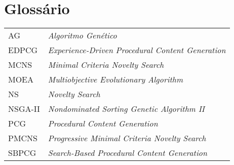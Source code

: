 \chapter*{Glossário}

\begin{tabular}{l p{}}
  AG & \emph{Algoritmo Genético} \\
  EDPCG & \emph{Experience-Driven Procedural Content Generation} \\
  MCNS & \emph{Minimal Criteria Novelty Search} \\
  MOEA & \emph{Multiobjective Evolutionary Algorithm} \\
  NS & \emph{Novelty Search} \\
  NSGA-II & \emph{Nondominated Sorting Genetic Algorithm II} \\
  PCG & \emph{Procedural Content Generation} \\
  PMCNS & \emph{Progressive Minimal Criteria Novelty Search} \\
  SBPCG & \emph{Search-Based Procedural Content Generation} \\
\end{tabular}